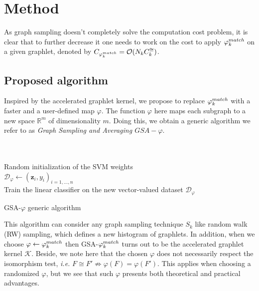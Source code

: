 \documentclass{article}
\begin{document}
\section{Method} \label{ssed to get a lowerec:pagestyle}
As graph sampling doesn't completely solve the computation cost problem, it is clear that to further decrease it one needs to work on the cost to apply $\varphi^{match}_k$ on a given graphlet, denoted by $C_{\varphi^{match}_k}=\mathcal{O}(N_k C_k^{\cong})$.

\subsection{Proposed algorithm}
\label{sec:algo}
Inspired by the accelerated graphlet kernel, we propose to replace $\varphi^{match}_k$ with a faster and a user-defined map $\varphi$. The function $\varphi$ here maps each subgraph to a new space $\mathbb{R}^m$ of dimensionality $m$. Doing this, we obtain a generic algorithm we refer to as \emph{Graph Sampling and Averaging $GSA-\varphi$}. 

\begin{algorithm}[h]
	
\DontPrintSemicolon
  \\
  \\
  \Algo{\\}
  Random initialization of the SVM weights\\
  $\mathcal{D}_{\varphi}\gets (\mathbf{z}_i,y_i)_{i=1,\ldots, n}$\\
  Train the linear classifier on the new vector-valued dataset $\mathcal{D}_{\varphi}$
\caption{GSA-$\varphi$ generic algorithm}
\end{algorithm}
This algorithm can consider any graph sampling technique $S_k$ like random walk (RW) sampling, which defines a new histogram of graphlets. In addition, when we choose $\varphi\gets \varphi^{match}_k$ then GSA-$\varphi^{match}_k$ turns out to be the accelerated graphlet kernel $\mathcal{K}$. Beside, we note here that the chosen $\varphi$ does not necessarily respect the isomorphism test, \emph{i.e.} $F\cong F' \not\Rightarrow \varphi(F)= \varphi(F')$. This applies when choosing a randomized $\varphi$, but we see that such $\varphi$ presents both theoretical and practical advantages.
\end{document}
